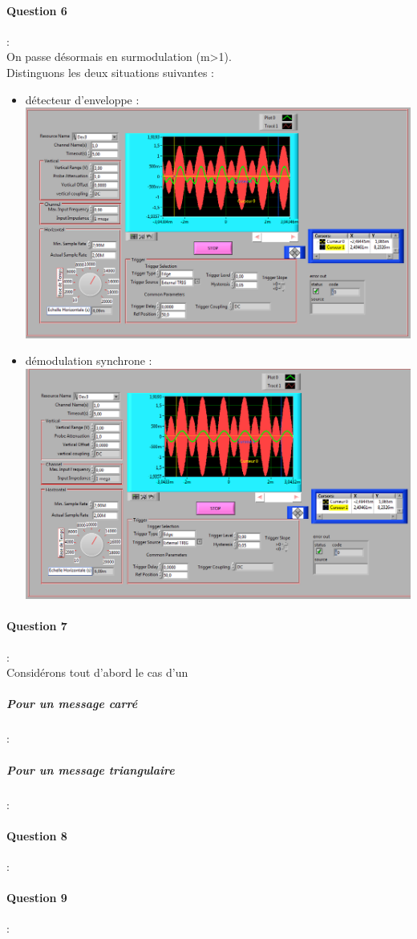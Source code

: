 \documentclass[french]{article}
\begin{document}
\paragraph{Question 6} : \\
On passe désormais en surmodulation (m>1). \\
Distinguons les deux situations suivantes : \\
\begin{itemize}
\item détecteur d'enveloppe :  \\
\includegraphics[width=\textwidth]{enveloppe.png}
\item démodulation synchrone : \\
\includegraphics[width=\textwidth]{synchrone.png}
\end{itemize}

\paragraph{Question 7} : \\
Considérons tout d'abord le cas d'un
\subparagraph{Pour un message carré} : \\

\subparagraph{Pour un message triangulaire} : \\

\paragraph{Question 8} : \\

\paragraph{Question 9} : \\
\end{document}
